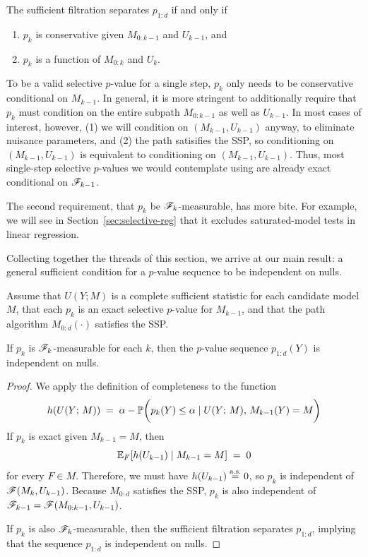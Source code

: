 \documentclass{article}
\begin{document}
The sufficient filtration separates $p_{1:d}$ if and only if 
\begin{enumerate}
\item $p_k$ is conservative given $M_{0:k-1}$ and $U_{k-1}$, and 
\item $p_k$ is a function of $M_{0:k}$ and $U_k$.
\end{enumerate}

To be a valid selective $p$-value for a single step, $p_k$ only needs to be conservative conditional on $M_{k-1}$. In general, it is more stringent to additionally require that $p_k$ must condition on the entire subpath $M_{0:k-1}$ as well as $U_{k-1}$. In most cases of interest, however, (1) we will condition on $(M_{k-1}, U_{k-1})$ anyway, to eliminate nuisance parameters, and (2) the path satisifies the SSP, so conditioning on $(M_{k-1}, U_{k-1})$ is equivalent to conditioning on $(M_{k-1}, U_{k-1})$. Thus, most single-step selective $p$-values we would contemplate using are already exact conditional on $\sF_{k-1}$.

The second requirement, that $p_k$ be $\sF_k$-measurable, has more bite. For example, we will see in Section~\ref{sec:selective-reg} that it excludes saturated-model tests in linear regression.

Collecting together the threads of this section, we arrive at our main result: a general sufficient condition for a $p$-value sequence to be independent on nulls.
\begin{theorem} \label{thm:suffCond}
Assume that $U(Y; M)$ is a complete sufficient statistic for each candidate model $M$, that each $p_k$ is an exact selective $p$-value for $M_{k-1}$, and that the path algorithm $M_{0:d}(\cdot)$ satisfies the SSP.

If $p_k$ is $\sF_k$-measurable for each $k$, then the $p$-value sequence $p_{1:d}(Y)$ is independent on nulls.
\end{theorem}

\begin{proof}
We apply the definition of completeness to the function 
\[
h(U(Y; \, M)) \;=\; 
\alpha - \P\bigg(p_k(Y) \leq \alpha \mid U(Y; \, M), \, M_{k-1}(Y) = M\bigg)
\]
If $p_k$ is exact given $M_{k-1} = M$, then 
\[
\E_F[h(U_{k-1}) \mid M_{k-1}=M] \;=\; 0
\] 
for every $F\in M$. Therefore, we must have $h(U_{k-1})\eqAS 0$, so $p_k$ is independent of $\sF(M_k, U_{k-1})$. Because $M_{0:d}$ satisfies the SSP, $p_k$ is also independent of $\sF_{k-1} = \sF(M_{0:k-1}, U_{k-1})$.

If $p_k$ is also $\sF_k$-measurable, then the sufficient filtration separates $p_{1:d}$, implying that the sequence $p_{1:d}$ is independent on nulls.
\end{proof}
\end{document}
